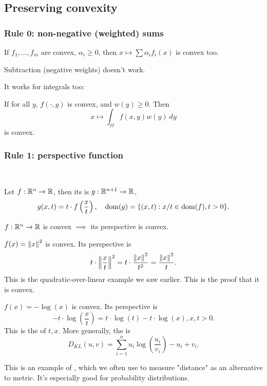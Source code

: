 \documentclass[class=article,crop=false]{standalone}
\begin{document}
\subsection{Preserving convexity}

\subsubsection{Rule 0: non-negative (weighted) sums}
If $ f_1, \ldots, f_m$ are convex, $ \alpha_i \geq 0$, then
$ x \mapsto \sum \alpha_i f_i(x)$ is convex too.

Subtraction (negative weights) doesn't work. 

It works for integrals too:

If for all $ y$,  $ f( \cdot ,y)$ is convex, and $ w(y) \geq 0$. Then
\[
	x \mapsto \int_{\Omega} f(x,y) w(y)\ dy
\]
is convex.

\subsubsection{Rule 1: perspective function}

~\begin{defn}[perspective]
Let $ f: \mathbb{R}^{n} \to \mathbb{R}$, then its  is $ g: \mathbb{R}^{n+1} \to \mathbb{R}$,
\[
	g(x,t) = t \cdot f\left(\frac{x}{t}\right), \quad \operatorname{dom}(g) = \{(x,t): x / t \in \operatorname{dom}(f), t>0\} 
.\] 
\end{defn}
\begin{prop}
$ f: \mathbb{R}^{n} \to \mathbb{R}$ is convex $ \implies$ its perspective is convex.
\end{prop}

\begin{eg}
	$ f(x) = {\left\lVert{ x}\right\rVert}^2 $ is convex. Its perspective is
	\[
	t \cdot {\left\lVert{ \frac{x}{t}}\right\rVert}^2 = t \cdot \frac{{\left\lVert{ x}\right\rVert}^2 }{t^2 }  = \frac{{\left\lVert{ x}\right\rVert}^2 }{t } 
	.\] 
	This is the quadratic-over-linear example we saw earlier. This is the proof that it is convex.
\end{eg}
\begin{eg}
	$ f(x) = -\log(x)$ is convex. Its perspective is
	\[
		-t \cdot \log\left( \frac{x}{t} \right) = t \cdot \log(t) - t \cdot \log(x), x,t>0
	.\]
	This is the  of $ t,x$. More generally, the  is
	\[
		D_{KL} (u,v) = \sum_{ i= 1}^{ n} u_i \log\left( \frac{u_i}{v_i } \right) -u_i+v_i
	.\] 

This is an example of , which we often use to measure "distance" as an alternative to metric. It's especially good for probability distributions.
\end{eg}
\end{document}
